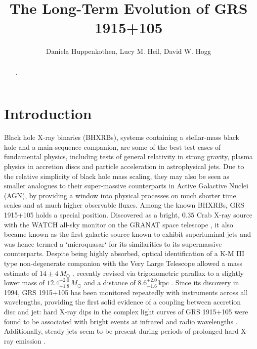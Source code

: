 \documentclass[12pt]{emulateapj}
\begin{document}
\title{The Long-Term Evolution of GRS 1915+105}

\author{Daniela Huppenkothen, Lucy M. Heil, David W. Hogg}
 
  

\begin{abstract}
.

\end{abstract}


\section{Introduction}

Black hole X-ray binaries (BHXRBs), systems containing a stellar-mass black hole and a main-sequence companion, are some of the best test cases of fundamental physics, including tests of general relativity in strong gravity, plasma physics in accretion discs and particle acceleration in astrophysical jets. 
Due to the relative simplicity of black hole mass scaling, they may also be seen as smaller analogues to their super-massive counterparts in Active Galactive Nuclei (AGN), by providing a window into physical processes on much shorter time scales and at much higher observable fluxes.
Among the known BHXRBs, GRS 1915+105 holds a special position. Discovered as a bright, $0.35$ Crab X-ray source \citep{castrotirado1994} with the WATCH all-sky monitor on the GRANAT space telescope \citep{castrotirado1992}, it also became known as the first galactic source known to exhibit superluminal jets \citep{mirabel1994, fender1999} and was hence termed a `microquasar` for its similarities to its supermassive counterparts. 
Despite being highly absorbed, optical identification of a K-M III type non-degenerate companion with the Very Large Telescope allowed a mass estimate of $14\pm 4\,M_\odot$ \citep{greiner2001}, recently revised via trigonometric parallax to a slightly lower mass of $12.4^{+2.0}_{-1.8}\, M_\odot$ and a distance of $8.6^{+2.0}_{-1.6}\,\mathrm{kpc}$ \citep{reid2014}. 
Since its discovery in 1994, GRS 1915+105 has been monitored repeatedly with instruments across all wavelengths, providing the first solid evidence of a coupling between accretion disc and jet: hard X-ray dips in the complex light curves of GRS 1915+105 were found to be associated with bright events at infrared and radio wavelengths \citep{pooley1997, eikenberry1998a, eikenberry1998b, kleinwolt2002}. Additionally, steady jets seem to be present during periods of prolonged hard X-ray emission \citep{foster1996, dhawan2000, fuchs2003}. 
\end{document}
